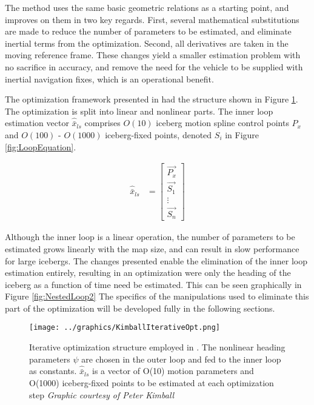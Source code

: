 The method uses the same basic geometric relations as a starting point, and improves on them in two key regards. First, several mathematical substitutions are made to reduce the number of parameters to be estimated, and eliminate inertial terms from the optimization. Second, all derivatives are taken in the moving reference frame. These changes yield a smaller estimation problem with no sacrifice in accuracy, and remove the need for the vehicle to be supplied with inertial navigation fixes, which is an operational benefit.

The optimization framework presented in \cite{Kimball2011b} had the structure shown in Figure \ref{fig:NestedLoop}. The optimization is split into linear and nonlinear parts. The inner loop estimation vector $\hat{\bar{x}}_{ls}$ comprises $O(10)$ iceberg motion spline control points $P_x$ and $O(100)$ - $O(1000)$ iceberg-fixed points, denoted $S_i$ in Figure \ref{fig:LoopEquation}.

\begin{align}
\hat{\bar{x}}_{ls} &= 
        \left[\begin{array}{c}
        \vec{P_x}\\
        \vec{S_1}\\
        \vdots\\
        \vec{S_n}
        \end{array}
        \right]
\end{align}

Although the inner loop is a linear operation, the number of parameters to be estimated grows linearly with the map size, and can result in slow performance for large icebergs. The changes presented enable the elimination of the inner loop estimation entirely, resulting in an optimization were only the heading of the iceberg as a function of time need be estimated. This can be seen graphically in Figure \ref{fig:NestedLoop2} The specifics of the manipulations used to eliminate this part of the optimization will be developed fully in the following sections. 

\begin{figure}[htbp]
   \centering
   \texttt{[image: ../graphics/KimballIterativeOpt.png]} %
   \caption{Iterative optimization structure employed in \cite{Kimball2011b}. The nonlinear heading parameters $\psi$ are chosen in the outer loop and fed to the inner loop as constants. $\hat{\bar{x}}_{ls}$ is a vector of O(10) motion parameters and O(1000) iceberg-fixed points to be estimated at each optimization step  \emph{Graphic courtesy of Peter Kimball}}
   \label{fig:NestedLoop}
\end{figure}


